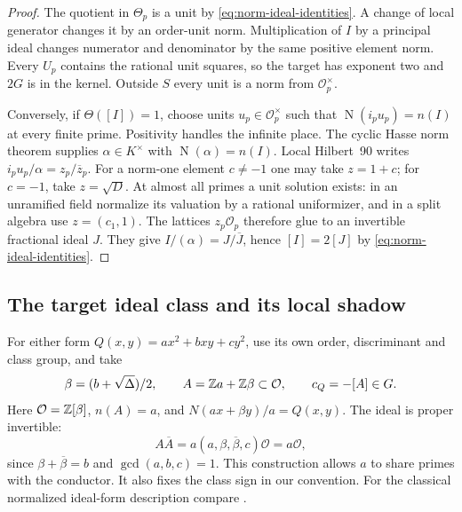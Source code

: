 \begin{proof}
The quotient in $\Theta_p$ is a unit by
\eqref{eq:norm-ideal-identities}.  A change of local generator changes
it by an order-unit norm.  Multiplication of $I$ by a principal ideal
changes numerator and denominator by the same positive element norm.
Every $U_p$ contains the rational unit squares, so the target has
exponent two and $2G$ is in the kernel.  Outside $S$ every unit is a
norm from $\mathcal O_p^\times$.

Conversely, if $\Theta([I])=1$, choose units $u_p\in\mathcal O_p^\times$
such that $\operatorname N(i_pu_p)=n(I)$ at every finite prime.
Positivity handles the infinite place.  The cyclic Hasse norm theorem
\cite[Chapter~VIII, Theorem~3.1]{milnecft} supplies $\alpha\in K^\times$
with $\operatorname N(\alpha)=n(I)$.  Local Hilbert~90 writes
$i_pu_p/\alpha=z_p/\overline z_p$.  For a norm-one element $c\ne-1$
one may take $z=1+c$; for $c=-1$, take $z=\sqrt D$.  At almost all
primes a unit solution exists: in an unramified field normalize its
valuation by a rational uniformizer, and in a split algebra use
$z=(c_1,1)$.  The lattices $z_p\mathcal O_p$ therefore glue to an
invertible fractional ideal $J$.  They give
$I/(\alpha)=J/\overline J$, hence $[I]=2[J]$ by
\eqref{eq:norm-ideal-identities}.

\end{proof}

\subsection{The target ideal class and its local shadow}

For either form \(Q(x,y)=ax^2+bxy+cy^2\), use its own order,
discriminant and class group, and take
\[
 \beta=(b+\sqrt\Delta)/2,\qquad
 A=\mathbb Z a+\mathbb Z\beta\subset\mathcal O,\qquad c_Q=-[A]\in G.
\]
Here \(\mathcal O=\mathbb Z[\beta]\), \(n(A)=a\), and
\(N(ax+\beta y)/a=Q(x,y)\). The ideal is proper invertible:
\[
 A\overline A=a(a,\beta,\overline\beta,c)\mathcal O=a\mathcal O,
\]
since \(\beta+\overline\beta=b\) and \(\gcd(a,b,c)=1\).
This construction allows \(a\) to share primes with the conductor.
It also fixes the class sign in our convention. For the classical
normalized ideal-form description compare
\cite[Lemma 10.2]{khayutin}.

